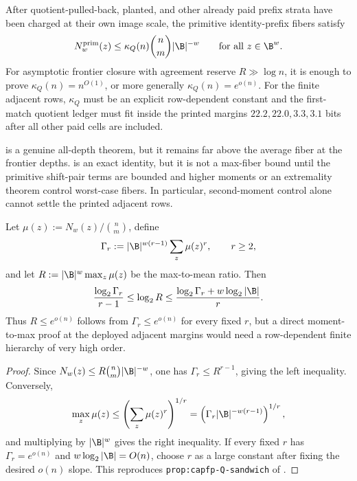 \begin{conjecture}\label{conj:q-active}
After quotient-pulled-back, planted, and other already paid prefix strata have
been charged at their own image scale, the primitive identity-prefix fibers
satisfy
\[
        N_w^{\mathrm{prim}}(z)
        \le
        \kappa_Q(n)\binom{n}{m}|\B|^{-w}
        \qquad\text{for all }z\in\B^w.
\]
For asymptotic frontier closure with agreement reserve \(R\gg\log n\), it is
enough to prove \(\kappa_Q(n)=n^{O(1)}\), or more generally
\(\kappa_Q(n)=e^{o(n)}\).  For the finite adjacent rows, \(\kappa_Q\) must be
an explicit row-dependent constant and the first-match quotient ledger must fit
inside the printed margins \(22.2,22.0,3.3,3.1\) bits after all other paid
cells are included.
\end{conjecture}

\begin{remark}
\label{rem:q-not-proved}
 is a genuine all-depth theorem, but it remains far
above the average fiber at the frontier depths.  
is an exact identity, but it is not a max-fiber bound until the primitive
shift-pair terms are bounded and higher moments or an extremality theorem
control worst-case fibers.  In particular, second-moment control alone cannot
settle the printed adjacent rows.
\end{remark}

\begin{proposition}\label{prop:q-moment-sandwich}
Let \(\mu(z):=N_w(z)/\binom{n}{m}\), define
\[
        \Gamma_r:=|\B|^{w(r-1)}\sum_z\mu(z)^r,\qquad r\ge2,
\]
and let \(R:=|\B|^w\max_z\mu(z)\) be the max-to-mean ratio.  Then
\[
        { \log_2\Gamma_r\over r-1}
        \le
        \log_2 R
        \le
        { \log_2\Gamma_r+w\log_2|\B|\over r}.
\]
Thus \(R\le e^{o(n)}\) follows from \(\Gamma_r\le e^{o(n)}\) for every fixed
\(r\), but a direct moment-to-max proof at the deployed adjacent margins would
need a row-dependent finite hierarchy of very high order.
\end{proposition}

\begin{proof}
Since \(N_w(z)\le R\binom{n}{m}|\B|^{-w}\), one has
\(\Gamma_r\le R^{r-1}\), giving the left inequality.  Conversely,
\[
        \max_z\mu(z)\le \left(\sum_z\mu(z)^r\right)^{1/r}
        =\left(\Gamma_r|\B|^{-w(r-1)}\right)^{1/r},
\]
and multiplying by \(|\B|^w\) gives the right inequality.  If every fixed
\(r\) has \(\Gamma_r=e^{o(n)}\) and \(w\log_2|\B|=O(n)\), choose \(r\) as a
large constant after fixing the desired \(o(n)\) slope.  This reproduces
\texttt{prop:capfp-Q-sandwich} of \cite{CAP25v13}.
\end{proof}

